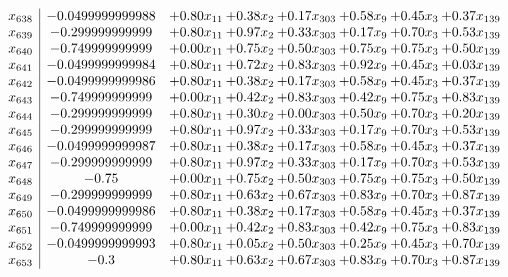 \documentclass[8pt]{article}
\begin{document}
\[\begin{array}{c| c c@{\hskip 2pt} c@{\hskip 2pt} c@{\hskip 2pt} c@{\hskip 2pt} c@{\hskip 2pt} c@{\hskip 2pt} }
 x_{638}   &  -0.0499999999988 & +  0.80 x_{11} & +  0.38 x_{2} & +  0.17 x_{303} & +  0.58 x_{9} & +  0.45 x_{3} & +  0.37 x_{139}\\
 x_{639}   &  -0.299999999999 & +  0.80 x_{11} & +  0.97 x_{2} & +  0.33 x_{303} & +  0.17 x_{9} & +  0.70 x_{3} & +  0.53 x_{139}\\
 x_{640}   &  -0.749999999999 & +  0.00 x_{11} & +  0.75 x_{2} & +  0.50 x_{303} & +  0.75 x_{9} & +  0.75 x_{3} & +  0.50 x_{139}\\
 x_{641}   &  -0.0499999999984 & +  0.80 x_{11} & +  0.72 x_{2} & +  0.83 x_{303} & +  0.92 x_{9} & +  0.45 x_{3} & +  0.03 x_{139}\\
 x_{642}   &  -0.0499999999986 & +  0.80 x_{11} & +  0.38 x_{2} & +  0.17 x_{303} & +  0.58 x_{9} & +  0.45 x_{3} & +  0.37 x_{139}\\
 x_{643}   &  -0.749999999999 & +  0.00 x_{11} & +  0.42 x_{2} & +  0.83 x_{303} & +  0.42 x_{9} & +  0.75 x_{3} & +  0.83 x_{139}\\
 x_{644}   &  -0.299999999999 & +  0.80 x_{11} & +  0.30 x_{2} & +  0.00 x_{303} & +  0.50 x_{9} & +  0.70 x_{3} & +  0.20 x_{139}\\
 x_{645}   &  -0.299999999999 & +  0.80 x_{11} & +  0.97 x_{2} & +  0.33 x_{303} & +  0.17 x_{9} & +  0.70 x_{3} & +  0.53 x_{139}\\
 x_{646}   &  -0.0499999999987 & +  0.80 x_{11} & +  0.38 x_{2} & +  0.17 x_{303} & +  0.58 x_{9} & +  0.45 x_{3} & +  0.37 x_{139}\\
 x_{647}   &  -0.299999999999 & +  0.80 x_{11} & +  0.97 x_{2} & +  0.33 x_{303} & +  0.17 x_{9} & +  0.70 x_{3} & +  0.53 x_{139}\\
 x_{648}   &  -0.75 & +  0.00 x_{11} & +  0.75 x_{2} & +  0.50 x_{303} & +  0.75 x_{9} & +  0.75 x_{3} & +  0.50 x_{139}\\
 x_{649}   &  -0.299999999999 & +  0.80 x_{11} & +  0.63 x_{2} & +  0.67 x_{303} & +  0.83 x_{9} & +  0.70 x_{3} & +  0.87 x_{139}\\
 x_{650}   &  -0.0499999999986 & +  0.80 x_{11} & +  0.38 x_{2} & +  0.17 x_{303} & +  0.58 x_{9} & +  0.45 x_{3} & +  0.37 x_{139}\\
 x_{651}   &  -0.749999999999 & +  0.00 x_{11} & +  0.42 x_{2} & +  0.83 x_{303} & +  0.42 x_{9} & +  0.75 x_{3} & +  0.83 x_{139}\\
 x_{652}   &  -0.0499999999993 & +  0.80 x_{11} & +  0.05 x_{2} & +  0.50 x_{303} & +  0.25 x_{9} & +  0.45 x_{3} & +  0.70 x_{139}\\
 x_{653}   &  -0.3 & +  0.80 x_{11} & +  0.63 x_{2} & +  0.67 x_{303} & +  0.83 x_{9} & +  0.70 x_{3} & +  0.87 x_{139}\\

\end{array}\]
\end{document}
